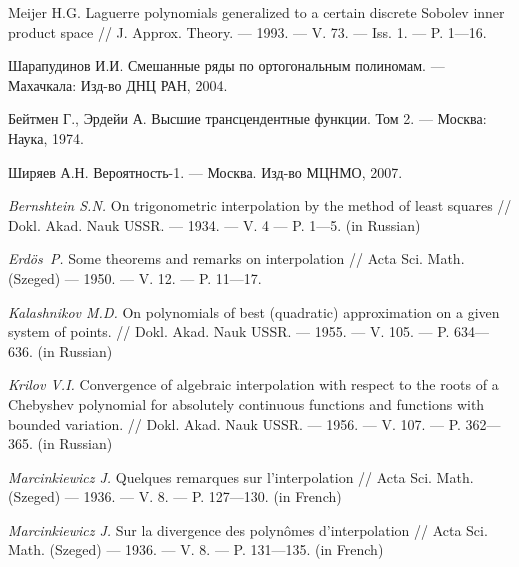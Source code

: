 \begin{thebibliography}{111}
Meijer H.G. Laguerre polynomials generalized to a certain discrete Sobolev inner product space // J. Approx. Theory. --- 1993. --- V. 73. --- Iss. 1. --- P. 1---16.

Шарапудинов И.И. Смешанные ряды по ортогональным полиномам. --- Махачкала: Изд-во ДНЦ РАН, 2004.

Бейтмен Г., Эрдейи А. Высшие трансцендентные функции. Том 2. --- Москва: Наука, 1974.

Ширяев А.Н. Вероятность-1. --- Москва. Изд-во МЦНМО, 2007.


\textit{Bernshtein S.N.}
On trigonometric interpolation by the method of least squares
 // Dokl. Akad. Nauk USSR. --- 1934. --- V. 4 --- P. 1---5. (in Russian)

\textit{Erd{\"o}s~P.} Some theorems and remarks on interpolation // Acta Sci. Math. (Szeged) --- 1950. --- V. 12. --- P. 11---17.


\textit{Kalashnikov M.D.}
On polynomials of best (quadratic) approximation on a given system of points.
 // Dokl. Akad. Nauk USSR. --- 1955. --- V. 105. --- P. 634---636. (in Russian)

\textit{Krilov V.I.}
Convergence of algebraic interpolation with respect to the roots of a Chebyshev polynomial for absolutely continuous functions and functions with bounded variation.
 // Dokl. Akad. Nauk USSR. --- 1956. --- V. 107. --- P. 362---365. (in Russian)

\textit{Marcinkiewicz J.} Quelques remarques sur l'interpolation // Acta Sci. Math. (Szeged) --- 1936. --- V. 8. --- P. 127---130. (in French)

\textit{Marcinkiewicz J.} Sur la divergence des polyn{\^o}mes d'interpolation // Acta Sci. Math. (Szeged) --- 1936. --- V. 8. --- P. 131---135. (in French)


\end{thebibliography}
